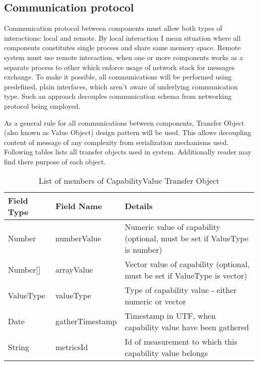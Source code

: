 \subsection{Communication protocol}
\label{subsec:arch_comm_protocol}
Communication protocol between components must allow both types of interactions: local and remote. By local interaction
I mean situation where all components constitutes single process and share same memory space. Remote system must use
remote interaction, when one or more components works as a separate process to other which enforce usage of network
stack for messages exchange. To make it possible, all communications will be performed using predefined, plain
interfaces, which aren't aware of underlying communication type. Such an approach decouples communication schema
from networking protocol being employed.

As a general rule for all communications between components, Transfer Object (also known as Value Object) design
pattern will be used\cite{0131422464}. This allows decoupling content of message of any complexity from serialization
mechanisms used. Following tables lists all transfer objects used in system. Additionally reader may find there purpose
of each object. 

\renewcommand*\arraystretch{1.2}


\begin{table}[h] %
\begin{tabular}{| m{} | m{} | m{} |}
   \hline 
   \cellcolor[gray]{0.9} Field Type & \cellcolor[gray]{0.9} Field Name & \cellcolor[gray]{0.9} Details \\
   \hline 
   Number & numberValue & Numeric value of capability (optional, must be set if ValueType is number) \\
   Number[] & arrayValue & Vector value of capability (optional, must be set if ValueType is vector)  \\
   ValueType & valueType & Type of capability value - either numeric or vector\\
   Date & gatherTimestamp & Timestamp in UTF, when capability value have been gathered \\
   String & metricsId & Id of measurement to which this capability value belongs \\
   \hline 
\end{tabular}
 \caption{List of members of CapabilityValue Transfer Object}
 \label{tab:TO_CapValue}
\end{table} %

